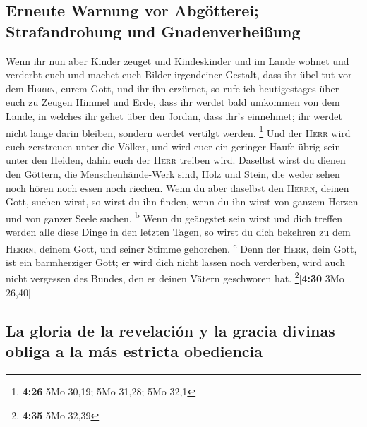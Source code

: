\hypertarget{erneute-warnung-vor-abguxf6tterei-strafandrohung-und-gnadenverheiuxdfung}{%
\subsection{Erneute Warnung vor Abgötterei; Strafandrohung und
Gnadenverheißung}\label{erneute-warnung-vor-abguxf6tterei-strafandrohung-und-gnadenverheiuxdfung}}

 Wenn ihr nun aber Kinder zeuget und Kindeskinder und im
Lande wohnet und verderbt euch und machet euch Bilder irgendeiner
Gestalt, dass ihr übel tut vor dem \textsc{Herrn}, eurem Gott, und ihr
ihn erzürnet,  so rufe ich heutigestages über euch zu
Zeugen Himmel und Erde, dass ihr werdet bald umkommen von dem Lande, in
welches ihr gehet über den Jordan, dass ihr's einnehmet; ihr werdet
nicht lange darin bleiben, sondern werdet vertilgt werden. \footnote{\textbf{4:26}
  5Mo 30,19; 5Mo 31,28; 5Mo 32,1}  Und der \textsc{Herr}
wird euch zerstreuen unter die Völker, und wird euer ein geringer Haufe
übrig sein unter den Heiden, dahin euch der \textsc{Herr} treiben wird.
 Daselbst wirst du dienen den Göttern, die
Menschenhände-Werk sind, Holz und Stein, die weder sehen noch hören noch
essen noch riechen.  Wenn du aber daselbst den
\textsc{Herrn}, deinen Gott, suchen wirst, so wirst du ihn finden, wenn
du ihn wirst von ganzem Herzen und von ganzer Seele suchen.
\textsuperscript{b}  Wenn du geängstet sein wirst und
dich treffen werden alle diese Dinge in den letzten Tagen, so wirst du
dich bekehren zu dem \textsc{Herrn}, deinem Gott, und seiner Stimme
gehorchen. \textsuperscript{c}  Denn der \textsc{Herr},
dein Gott, ist ein barmherziger Gott; er wird dich nicht lassen noch
verderben, wird auch nicht vergessen des Bundes, den er deinen Vätern
geschworen hat. \footnote{\textbf{4:35} 5Mo 32,39}{[}\textbf{4:30} 3Mo
26,40{]}

\hypertarget{la-gloria-de-la-revelaciuxf3n-y-la-gracia-divinas-obliga-a-la-muxe1s-estricta-obediencia}{%
\subsection{La gloria de la revelación y la gracia divinas obliga a la
más estricta
obediencia}\label{la-gloria-de-la-revelaciuxf3n-y-la-gracia-divinas-obliga-a-la-muxe1s-estricta-obediencia}}


